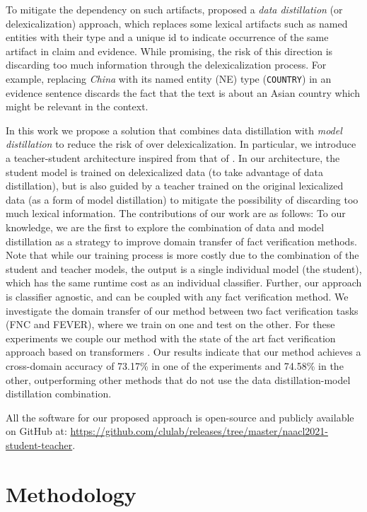 To mitigate the dependency on such artifacts, \citet{suntwal-etal-2019-importance} proposed a {\em data distillation} (or delexicalization) approach, which replaces some lexical artifacts such as named entities with their type and a unique id to indicate occurrence of the same artifact in claim and evidence. While promising, the risk of this direction is discarding too much information through the delexicalization process. For example, replacing {\em China} with its named entity (NE) type ({\tt COUNTRY}) in an evidence sentence discards the fact that the text is about an Asian country which might be relevant in the context.

In this work we propose a solution that combines data distillation with {\em model distillation} to reduce the risk of over delexicalization. In particular, we introduce a teacher-student architecture inspired from that of \cite{tarvainen2017mean}. In our architecture, the student model is trained on delexicalized data (to take advantage of data distillation), but is also guided by a teacher trained on the original lexicalized data (as a form of model distillation) to mitigate the possibility of discarding too much lexical information. The contributions of our work are as follows:
{} To our knowledge, we are the first to explore the combination of data and model distillation as a strategy to improve domain transfer of fact verification methods. Note that while our training process is more costly due to the combination of the student and teacher models, the output is a single individual model (the student), which has the same runtime cost as an individual classifier. Further, our approach is classifier agnostic, and can be coupled with any fact verification method.
{} We investigate the domain transfer of our method between two fact verification tasks (FNC and FEVER), where we train on one and test on the other. For these experiments we couple our method with the state of the art fact verification approach based on transformers \citep{vaswani2017attention}. Our results indicate that our method achieves a cross-domain accuracy of 73.17\% in one of the experiments and 74.58\% in the other, outperforming other methods that do not use the data distillation-model distillation combination.

All the software for our proposed approach is open-source and publicly available on GitHub at: \url{https://github.com/clulab/releases/tree/master/naacl2021-student-teacher}.

\section{Methodology}

